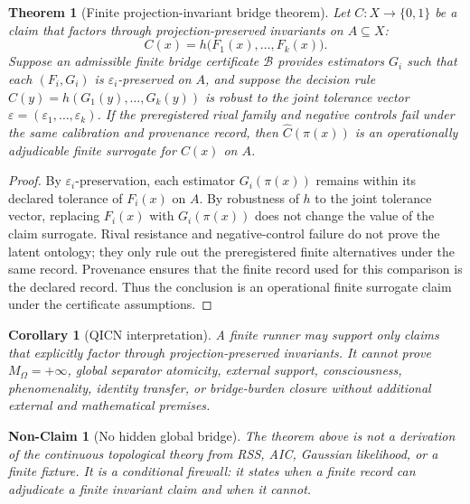 \documentclass[11pt]{article}
\newtheorem{theorem}{Theorem}
\newtheorem{corollary}{Corollary}
\newtheorem{nonclaim}{Non-Claim}
\begin{document}
\begin{theorem}[Finite projection-invariant bridge theorem]
Let $C:X\to\{0,1\}$ be a claim that factors through projection-preserved invariants on $A\subseteq X$:
\[
  C(x)=h\bigl(F_1(x),\ldots,F_k(x)\bigr).
\]
Suppose an admissible finite bridge certificate $\mathcal{B}$ provides estimators $G_i$ such that each $(F_i,G_i)$ is $\varepsilon_i$-preserved on $A$, and suppose the decision rule $\widehat C(y)=h(G_1(y),\ldots,G_k(y))$ is robust to the joint tolerance vector $\varepsilon=(\varepsilon_1,\ldots,\varepsilon_k)$. If the preregistered rival family and negative controls fail under the same calibration and provenance record, then $\widehat C(\pi(x))$ is an operationally adjudicable finite surrogate for $C(x)$ on $A$.
\end{theorem}
\begin{proof}
By $\varepsilon_i$-preservation, each estimator $G_i(\pi(x))$ remains within its declared tolerance of $F_i(x)$ on $A$. By robustness of $h$ to the joint tolerance vector, replacing $F_i(x)$ with $G_i(\pi(x))$ does not change the value of the claim surrogate. Rival resistance and negative-control failure do not prove the latent ontology; they only rule out the preregistered finite alternatives under the same record. Provenance ensures that the finite record used for this comparison is the declared record. Thus the conclusion is an operational finite surrogate claim under the certificate assumptions.
\end{proof}

\begin{corollary}[QICN interpretation]
A finite runner may support only claims that explicitly factor through projection-preserved invariants. It cannot prove $M_{\Omega}=+\infty$, global separator atomicity, external support, consciousness, phenomenality, identity transfer, or bridge-burden closure without additional external and mathematical premises.
\end{corollary}

\begin{nonclaim}[No hidden global bridge]
The theorem above is not a derivation of the continuous topological theory from RSS, AIC, Gaussian likelihood, or a finite fixture. It is a conditional firewall: it states when a finite record can adjudicate a finite invariant claim and when it cannot.
\end{nonclaim}
\end{document}
